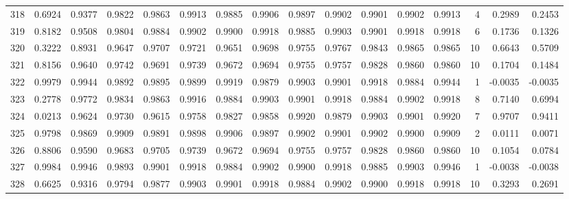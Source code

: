 \begin{tabular}{lrrrrrrrrrrrrrrr}
318 &      0.6924 &  0.9377 &  0.9822 &  0.9863 &  0.9913 &  0.9885 &  0.9906 &  0.9897 &  0.9902 &  0.9901 &   0.9902 &     0.9913 &      4 &                    0.2989 &                     0.2453 \\
319 &      0.8182 &  0.9508 &  0.9804 &  0.9884 &  0.9902 &  0.9900 &  0.9918 &  0.9885 &  0.9903 &  0.9901 &   0.9918 &     0.9918 &      6 &                    0.1736 &                     0.1326 \\
320 &      0.3222 &  0.8931 &  0.9647 &  0.9707 &  0.9721 &  0.9651 &  0.9698 &  0.9755 &  0.9767 &  0.9843 &   0.9865 &     0.9865 &     10 &                    0.6643 &                     0.5709 \\
321 &      0.8156 &  0.9640 &  0.9742 &  0.9691 &  0.9739 &  0.9672 &  0.9694 &  0.9755 &  0.9757 &  0.9828 &   0.9860 &     0.9860 &     10 &                    0.1704 &                     0.1484 \\
322 &      0.9979 &  0.9944 &  0.9892 &  0.9895 &  0.9899 &  0.9919 &  0.9879 &  0.9903 &  0.9901 &  0.9918 &   0.9884 &     0.9944 &      1 &                   -0.0035 &                    -0.0035 \\
323 &      0.2778 &  0.9772 &  0.9834 &  0.9863 &  0.9916 &  0.9884 &  0.9903 &  0.9901 &  0.9918 &  0.9884 &   0.9902 &     0.9918 &      8 &                    0.7140 &                     0.6994 \\
324 &      0.0213 &  0.9624 &  0.9730 &  0.9615 &  0.9758 &  0.9827 &  0.9858 &  0.9920 &  0.9879 &  0.9903 &   0.9901 &     0.9920 &      7 &                    0.9707 &                     0.9411 \\
325 &      0.9798 &  0.9869 &  0.9909 &  0.9891 &  0.9898 &  0.9906 &  0.9897 &  0.9902 &  0.9901 &  0.9902 &   0.9900 &     0.9909 &      2 &                    0.0111 &                     0.0071 \\
326 &      0.8806 &  0.9590 &  0.9683 &  0.9705 &  0.9739 &  0.9672 &  0.9694 &  0.9755 &  0.9757 &  0.9828 &   0.9860 &     0.9860 &     10 &                    0.1054 &                     0.0784 \\
327 &      0.9984 &  0.9946 &  0.9893 &  0.9901 &  0.9918 &  0.9884 &  0.9902 &  0.9900 &  0.9918 &  0.9885 &   0.9903 &     0.9946 &      1 &                   -0.0038 &                    -0.0038 \\
328 &      0.6625 &  0.9316 &  0.9794 &  0.9877 &  0.9903 &  0.9901 &  0.9918 &  0.9884 &  0.9902 &  0.9900 &   0.9918 &     0.9918 &     10 &                    0.3293 &                     0.2691 \\

\end{tabular}
